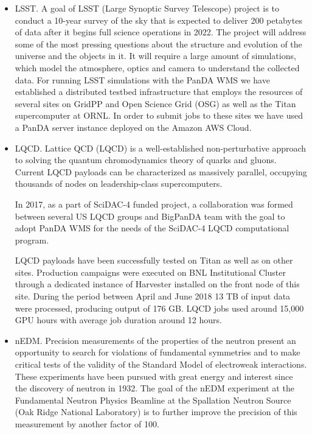 \begin{itemize}
    \item LSST.
A goal of LSST (Large Synoptic Survey Telescope) project is to conduct a
10-year survey of the sky that is expected to deliver 200 petabytes of data
after it begins full science operations in 2022. The project  will address some
of the most pressing questions about the structure and evolution of the
universe and the objects in it. It will require a large amount of simulations,
which model the atmosphere, optics and camera to understand the collected data.
For running LSST simulations with the PanDA WMS we have established a
distributed testbed infrastructure that employs the resources of several sites
on GridPP \cite{0954-3899-32-1-N01} and Open Science Grid (OSG)
\cite{1742-6596-78-1-012057} as well as the Titan supercomputer at ORNL. In
order to submit jobs to these sites we have used a PanDA server instance
deployed on the Amazon AWS Cloud.

    \item LQCD.
Lattice QCD (LQCD) \cite{Babich:2010:PQL:1884643.1884695} is a well-established
non-perturbative approach to solving the quantum chromodynamics theory of
quarks  and gluons. Current LQCD payloads can be characterized as massively
parallel,  occupying thousands of nodes on leadership-class supercomputers.

In 2017, as a part of SciDAC-4 funded project, a collaboration was formed
between several US LQCD groups and BigPanDA team with the goal to adopt PanDA
WMS for the needs of the SciDAC-4 LQCD computational program. 

LQCD payloads have been successfully tested on Titan as well as on other sites.
Production campaigns were executed on BNL Institutional Cluster through a
dedicated instance of Harvester installed on the front node of this site.
During the period between April and June 2018 13 TB of input data were
processed, producing output of 176 GB. LQCD jobs used around 15,000 GPU hours
with average job duration around 12 hours.

    \item nEDM.
Precision measurements of the properties of the neutron present an opportunity
to search for violations of fundamental symmetries and to make critical tests
of the validity of the Standard Model of electroweak interactions. These
experiments have been pursued \cite{Sakharov:1967dj} with great energy and
interest since the discovery of neutron in 1932. The goal of the nEDM
\cite{0954-3899-36-10-104002} experiment at the Fundamental Neutron Physics
Beamline at the Spallation Neutron Source (Oak Ridge National Laboratory) is to
further improve the precision of this measurement by another factor of 100.
\end{itemize}

